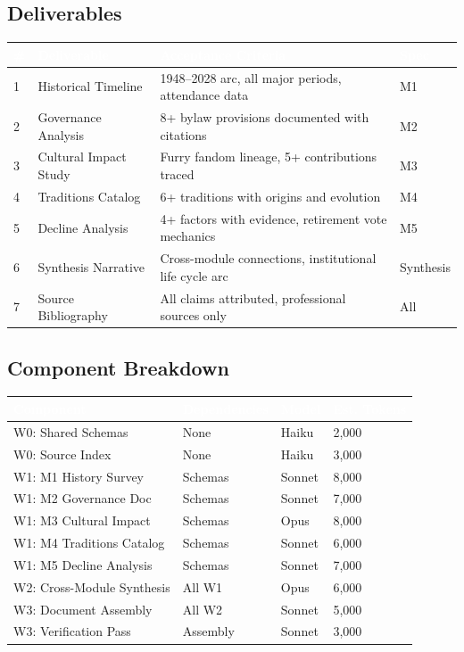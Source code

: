 \documentclass[11pt,letterpaper]{article}
\newcommand{\tableheader}[1]{\textbf{\sffamily\textcolor{white}{#1}}}
\begin{document}
\subsection{Deliverables}

\begin{center}
\begin{tabularx}{\textwidth}{C{0.6cm}L{3.5cm}XL{2.5cm}}
\toprule
{}
\tableheader{\#} & \tableheader{Deliverable} & \tableheader{Acceptance Criteria} & \tableheader{Spec} \\
 & Historical Timeline & 1948--2028 arc, all major periods, attendance data & M1 \\
2 & Governance Analysis & 8+ bylaw provisions documented with citations & M2 \\
3 & Cultural Impact Study & Furry fandom lineage, 5+ contributions traced & M3 \\
4 & Traditions Catalog & 6+ traditions with origins and evolution & M4 \\
5 & Decline Analysis & 4+ factors with evidence, retirement vote mechanics & M5 \\
6 & Synthesis Narrative & Cross-module connections, institutional life cycle arc & Synthesis \\
7 & Source Bibliography & All claims attributed, professional sources only & All \\
\bottomrule
\end{tabularx}
\end{center}

\subsection{Component Breakdown}

\begin{center}
\begin{tabularx}{\textwidth}{L{3.5cm}L{2cm}C{1.5cm}C{2cm}}
\toprule
{}
\tableheader{Component} & \tableheader{Dependencies} & \tableheader{Model} & \tableheader{Est. Tokens} \\
\midrule
W0: Shared Schemas & None & Haiku & 2,000 \\
W0: Source Index & None & Haiku & 3,000 \\
W1: M1 History Survey & Schemas & Sonnet & 8,000 \\
W1: M2 Governance Doc & Schemas & Sonnet & 7,000 \\
W1: M3 Cultural Impact & Schemas & Opus & 8,000 \\
W1: M4 Traditions Catalog & Schemas & Sonnet & 6,000 \\
W1: M5 Decline Analysis & Schemas & Sonnet & 7,000 \\
W2: Cross-Module Synthesis & All W1 & Opus & 6,000 \\
W3: Document Assembly & All W2 & Sonnet & 5,000 \\
W3: Verification Pass & Assembly & Sonnet & 3,000 \\
\bottomrule
\end{tabularx}
\end{center}
\end{document}
